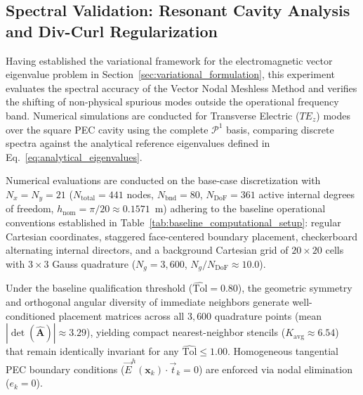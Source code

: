 \documentclass[preprint,12pt]{elsarticle}
\begin{document}
\subsection{Spectral Validation: Resonant Cavity Analysis and Div-Curl Regularization}
\label{subsec:cavity_eigenvalues}
Having established the variational framework for the electromagnetic vector eigenvalue problem in Section~\ref{sec:variational_formulation}, this experiment evaluates the spectral accuracy of the Vector Nodal Meshless Method and verifies the shifting of non-physical spurious modes outside the operational frequency band. Numerical simulations are conducted for Transverse Electric ($TE_z$) modes over the square PEC cavity using the complete $\mathcal{P}^1$ basis, comparing discrete spectra against the analytical reference eigenvalues defined in Eq.~\eqref{eq:analytical_eigenvalues}.

Numerical evaluations are conducted on the base-case discretization with $N_x = N_y = 21$ ($N_{\mathrm{total}} = 441$ nodes, $N_{\mathrm{bnd}} = 80$, $N_{\mathrm{DoF}} = 361$ active internal degrees of freedom, $h_{\mathrm{nom}} = \pi/20 \approx 0.1571$~m) adhering to the baseline operational conventions established in Table~\ref{tab:baseline_computational_setup}: regular Cartesian coordinates, staggered face-centered boundary placement, checkerboard alternating internal directors, and a background Cartesian grid of $20 \times 20$ cells with $3 \times 3$ Gauss quadrature ($N_g = 3{,}600$, $N_g / N_{\mathrm{DoF}} \approx 10.0$).

Under the baseline qualification threshold ($\widehat{\mathrm{Tol}} = 0.80$), the geometric symmetry and orthogonal angular diversity of immediate neighbors generate well-conditioned placement matrices across all $3{,}600$ quadrature points (mean $|\det(\widehat{\mathbf{A}})| \approx 3.29$), yielding compact nearest-neighbor stencils ($K_{\mathrm{avg}} \approx 6.54$) that remain identically invariant for any $\widehat{\mathrm{Tol}} \le 1.00$. Homogeneous tangential PEC boundary conditions ($\vec{E}^h(\mathbf{x}_k) \cdot \vec{t}_k = 0$) are enforced via nodal elimination ($e_k = 0$).
\end{document}
